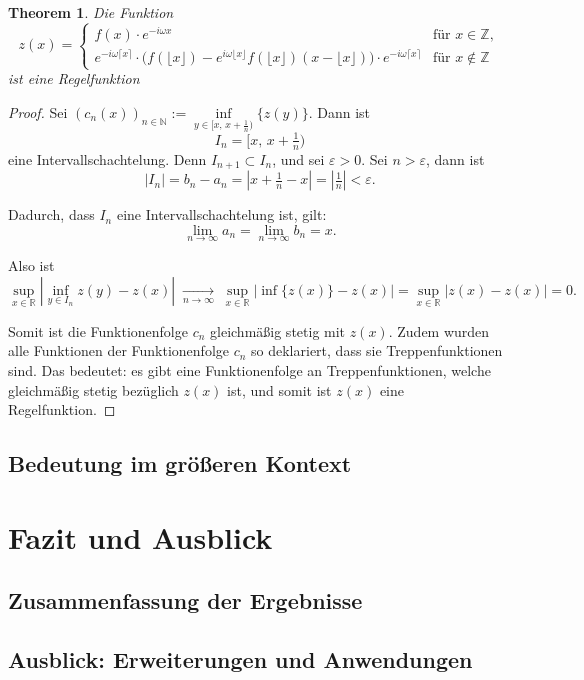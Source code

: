 \documentclass[a4paper,12pt]{article}
\newtheorem{theorem}{Theorem}[section]
\theoremstyle{definition}
\theoremstyle{remark}
\begin{document}
\begin{theorem}
  Die Funktion 
  \[
    z(x) =
    \begin{cases}
      f(x)\cdot e^{-i\omega x} & \text{für } x \in \mathbb{Z}, \\[6pt]
      e^{-i\omega \lceil x\rceil} \cdot \bigl( f(\lfloor x \rfloor) - e^{i\omega \lfloor x \rfloor} f(\lfloor x \rfloor)(x - \lfloor x \rfloor) \bigr) \cdot e^{-i\omega \lceil x\rceil} & \text{für } x \notin \mathbb{Z}
    \end{cases}
    \]
    ist eine Regelfunktion
  \end{theorem}
  \begin{proof}
    Sei \((c_n(x))_{n \in \mathbb{N}} := \underset{y \in \bigl[x,\, x + \tfrac{1}{n}\bigr)}{\inf} \{z(y)\}\).
    Dann ist 
    \[
      I_n = \bigl[ x,\, x + \tfrac{1}{n} \bigr)
      \]
      eine Intervallschachtelung. Denn \( I_{n+1} \subset I_n \), und sei \(\varepsilon > 0\).  
      Sei \( n > \varepsilon \), dann ist
      \[
        |I_n| = b_n - a_n = \left| x + \tfrac{1}{n} - x \right| = \left| \tfrac{1}{n} \right| < \varepsilon.
        \]
        
        Dadurch, dass \( I_n \) eine Intervallschachtelung ist, gilt:
        \[
          \lim_{n \to \infty} a_n = \lim_{n \to \infty} b_n = x.
          \]
          
          Also ist
          \[
            \sup_{x \in \mathbb{R}} \left| \inf_{y \in I_n} z(y) - z(x) \right| 
            \;\xrightarrow[n \to \infty]{}\;
            \sup_{x \in \mathbb{R}} \left| \inf \{z(x)\}- z(x) \right|
            = \sup_{x \in \mathbb{R}} \left| z(x) - z(x) \right| 
            = 0.
            \]
            
            \medskip
            
            Somit ist die Funktionenfolge \(c_n\) gleichmäßig stetig mit \(z(x)\).  
            Zudem wurden alle Funktionen der Funktionenfolge \(c_n\) so deklariert, 
            dass sie Treppenfunktionen sind. Das bedeutet: es gibt eine Funktionenfolge an 
            Treppenfunktionen, welche gleichmäßig stetig bezüglich \(z(x)\) ist, und somit 
            ist \(z(x)\) eine Regelfunktion.
            
          \end{proof}
          
          \subsection{Bedeutung im größeren Kontext}
          
          
          
          
          \section{Fazit und Ausblick}
          \subsection{Zusammenfassung der Ergebnisse}
          \subsection{Ausblick: Erweiterungen und Anwendungen}
          
\end{document}
